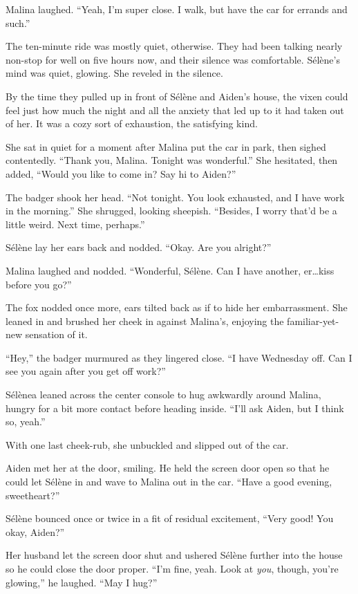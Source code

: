 Malina laughed. ``Yeah, I'm super close. I walk, but have the car for errands and such.''

The ten-minute ride was mostly quiet, otherwise. They had been talking nearly non-stop for well on five hours now, and their silence was comfortable. Sélène's mind was quiet, glowing. She reveled in the silence.

By the time they pulled up in front of Sélène and Aiden's house, the vixen could feel just how much the night and all the anxiety that led up to it had taken out of her. It was a cozy sort of exhaustion, the satisfying kind.

She sat in quiet for a moment after Malina put the car in park, then sighed contentedly. ``Thank you, Malina. Tonight was wonderful.'' She hesitated, then added, ``Would you like to come in? Say hi to Aiden?''

The badger shook her head. ``Not tonight. You look exhausted, and I have work in the morning.'' She shrugged, looking sheepish. ``Besides, I worry that'd be a little weird. Next time, perhaps.''

Sélène lay her ears back and nodded. ``Okay. Are you alright?''

Malina laughed and nodded. ``Wonderful, Sélène. Can I have another, er\ldots{}kiss before you go?''

The fox nodded once more, ears tilted back as if to hide her embarrassment. She leaned in and brushed her cheek in against Malina's, enjoying the familiar-yet-new sensation of it.

``Hey,'' the badger murmured as they lingered close. ``I have Wednesday off. Can I see you again after you get off work?''

Sélènea leaned across the center console to hug awkwardly around Malina, hungry for a bit more contact before heading inside. ``I'll ask Aiden, but I think so, yeah.''

With one last cheek-rub, she unbuckled and slipped out of the car.

Aiden met her at the door, smiling. He held the screen door open so that he could let Sélène in and wave to Malina out in the car. ``Have a good evening, sweetheart?''

Sélène bounced once or twice in a fit of residual excitement, ``Very good! You okay, Aiden?''

Her husband let the screen door shut and ushered Sélène further into the house so he could close the door proper. ``I'm fine, yeah. Look at \emph{you}, though, you're glowing,'' he laughed. ``May I hug?''


